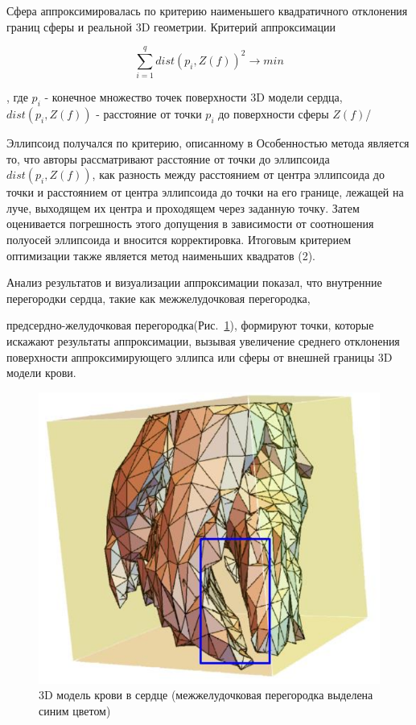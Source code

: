 \documentclass[conference]{IEEEtran}
\begin{document}
Сфера аппроксимировалась по критерию наименьшего квадратичного отклонения границ сферы и реальной 3D геометрии.
Критерий аппроксимации

\begin{equation}
    \sum_{i=1}^{q}dist(p_i,Z(f))^2 \rightarrow min
    \label{eq:sphere_criteria}
\end{equation}

, где $ p_i$ - конечное множество точек поверхности 3D модели сердца,
$dist(p_i,Z(f))$ - расстояние от точки $ p_i$ до поверхности сферы $Z(f)$/

Эллипсоид получался по критерию, описанному в
Особенностью метода является то, что авторы рассматривают расстояние от точки до эллипсоида
$dist(p_i,Z(f))$, как разность между расстоянием от центра эллипсоида до точки и расстоянием от центра
эллипсоида до точки на его границе, лежащей на луче, выходящем их центра и проходящем через заданную точку.
Затем оценивается погрешность этого допущения в зависимости от соотношения полуосей эллипсоида и вносится корректировка.
Итоговым критерием оптимизации также является метод наименьших квадратов (2).

Анализ результатов и визуализации аппроксимации показал, что внутренние перегородки сердца, такие как межжелудочковая перегородка,

предсердно-желудочковая перегородка(Рис.~\ref{fig:wall}), формируют точки, которые искажают результаты аппроксимации,
вызывая увеличение среднего отклонения поверхности аппроксимирующего эллипса или сферы от внешней границы 3D модели крови.

\begin{figure}[tbph]
    \centering
    \includegraphics[width=\linewidth]{fig/wall}
    \caption{3D модель крови в сердце (межжелудочковая перегородка выделена синим
    цветом)}
    \label{fig:wall}
\end{figure}
\end{document}
